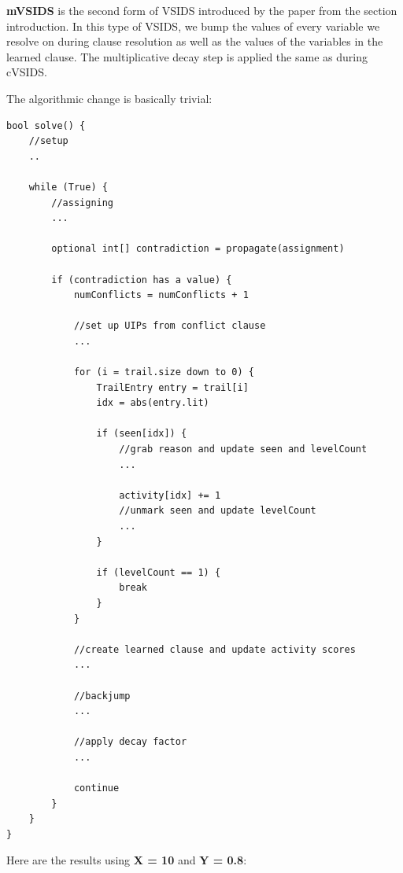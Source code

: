 \documentclass[oneside]{book}
\begin{document}
\textbf{mVSIDS} is the second form of VSIDS introduced by the paper from 
the section introduction. In this type of VSIDS, we bump the values of 
every variable we resolve on during clause resolution as well as the values 
of the variables in the learned clause. The multiplicative decay step is 
applied the same as during cVSIDS.

The algorithmic change is basically trivial:
\begin{lstlisting}
bool solve() {
    //setup
    ..

    while (True) {
        //assigning
        ...

        optional int[] contradiction = propagate(assignment)

        if (contradiction has a value) {
            numConflicts = numConflicts + 1

            //set up UIPs from conflict clause
            ...

            for (i = trail.size down to 0) {
                TrailEntry entry = trail[i]
                idx = abs(entry.lit)

                if (seen[idx]) {
                    //grab reason and update seen and levelCount
                    ...

                    activity[idx] += 1
                    //unmark seen and update levelCount
                    ...
                }

                if (levelCount == 1) {
                    break
                }
            }

            //create learned clause and update activity scores
            ...

            //backjump
            ...

            //apply decay factor
            ...

            continue
        }
    }
}
\end{lstlisting}
\noindent 
Here are the results using \textbf{X = 10} and \textbf{Y = 0.8}:
\end{document}
